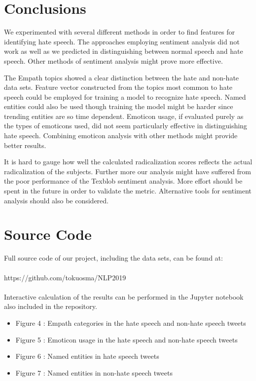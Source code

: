 \documentclass[conference]{IEEEtran}
\begin{document}
\section{Conclusions}
We experimented with several different methods in order to find features for identifying hate speech.
The approaches employing sentiment analysis did not work as well as we predicted in distinguishing between 
normal speech and hate speech. Other methods of sentiment analysis might prove more effective.

The Empath topics showed a clear distinction between the hate and non-hate data sets. Feature vector
constructed from the topics most common to hate speech could be employed for training a model to recognize 
hate speech. Named entities could also be used though training the model might be harder since 
trending entities are so time dependent. Emoticon usage, if evaluated purely as the types of 
emoticons used, did not seem particularly effective in distinguishing hate speech. Combining 
emoticon analysis with other methods might provide better results.

It is hard to gauge how well the calculated radicalization scores reflects the actual radicalization 
of the subjects. Further more our analysis might have suffered from the poor performance of the 
Texblob sentiment analysis. More effort should be spent in the future in order to validate the metric.
Alternative tools for sentiment analysis should also be considered.

\section*{Source Code} 
Full source code of our project, including the data sets, can be found at:
\\\\
https://github.com/tokuosma/NLP2019
\\\\
Interactive calculation of the results can be performed in the Jupyter notebook 
also included in the repository.



\vspace{12pt}

\appendix

\begin{itemize}
    \item Figure 4 : Empath categories in the hate speech and non-hate speech tweets 
    \item Figure 5 : Emoticon usage in the hate speech and non-hate speech tweets 
    \item Figure 6 : Named entities in hate speech tweets
    \item Figure 7 : Named entities in non-hate speech tweets
\end{itemize}
\end{document}
